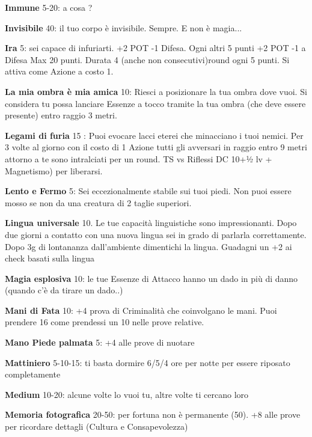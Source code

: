 \documentclass[a4paper,11pt,twoside,openany]{book}
\begin{document}
\textbf{Immune} 5-20: a cosa ?

\textbf{Invisibile} 40: il tuo corpo è invisibile. Sempre. E non è magia...

\textbf{Ira} 5: sei capace di infuriarti. +2 POT -1 Difesa. Ogni altri 5 punti +2 POT -1 a Difesa Max 20 punti. Durata 4 (anche non consecutivi)round ogni 5 punti. Si attiva come Azione a costo 1.

\textbf{La mia ombra è mia amica} 10: Riesci a posizionare la tua ombra dove vuoi. Si considera tu possa lanciare Essenze a tocco tramite la tua ombra (che deve essere presente) entro raggio 3 metri.

\textbf{Legami di furia} 15 : Puoi evocare lacci eterei che minacciano i tuoi nemici. Per 3 volte al giorno con il costo di 1 Azione tutti gli avversari in raggio entro 9 metri attorno a te sono intralciati per un round. TS vs Riflessi DC 10+½ lv + Magnetismo) per liberarsi.

\textbf{Lento e Fermo} 5: Sei eccezionalmente stabile sui tuoi piedi. Non puoi essere mosso se non da una creatura di 2 taglie superiori.

\textbf{Lingua universale} 10. Le tue capacità linguistiche sono impressionanti. Dopo due giorni a contatto con una nuova lingua sei in grado di parlarla correttamente. Dopo 3g di lontananza dall'ambiente dimentichi la lingua. Guadagni un +2 ai check basati sulla lingua

\textbf{Magia esplosiva} 10: le tue Essenze di Attacco hanno un dado in più di danno (quando c'è da tirare un dado..)

\textbf{Mani di Fata} 10: +4 prova di Criminalità che coinvolgano le mani. Puoi prendere 16 come prendessi un 10 nelle prove relative.

\textbf{Mano Piede palmata} 5: +4 alle prove di nuotare

\textbf{Mattiniero} 5-10-15: ti basta dormire 6/5/4 ore per notte
per essere riposato completamente

\textbf{Medium} 10-20: alcune volte lo vuoi tu, altre volte ti cercano loro

\textbf{Memoria fotografica} 20-50: per fortuna non è permanente (50). +8 alle prove per ricordare dettagli (Cultura e Consapevolezza)
\end{document}
